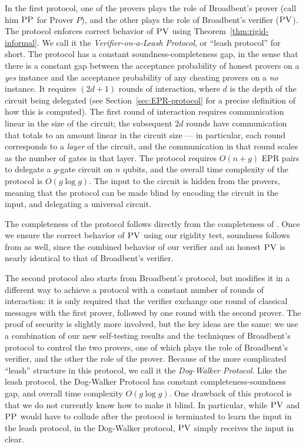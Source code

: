 \documentclass[11pt,letter]{article}
\theoremstyle{remark}
\theoremstyle{definition}
\newcommand{\pv}{\textsc{PV}}
\newcommand{\pp}{\textsc{PP}}
\begin{document}
In the first protocol, one of the provers plays the role of Broadbent's prover (call him $\pp$ for Prover $P$), and the other plays the role of Broadbent's verifier ($\pv$). The protocol enforces correct behavior of $\pv$ using Theorem~\ref{thm:rigid-informal}. We call it the \emph{Verifier-on-a-Leash Protocol}, or ``leash protocol'' for short. The protocol has a constant soundness-completeness gap, in the sense that there is a constant gap between the acceptance probability of honest provers on a \textit{yes} instance and the acceptance probability of any cheating provers on a \textit{no} instance. It requires $(2d+1)$ rounds of interaction, where $d$ is the depth of the circuit being delegated (see Section~\ref{sec:EPR-protocol} for a precise definition of how this is computed). The first round of interaction requires communication linear in the size of the circuit; the subsequent $2d$ rounds have communication that totals to an amount linear in the circuit size --- in particular, each round corresponds to a \emph{layer} of the circuit, and the communication in that round scales as the number of gates in that layer. The protocol requires $O(n+g)$ EPR pairs to delegate a $g$-gate circuit on $n$ qubits, and the overall time complexity of the protocol is $O(g\log g)$.
The input to the circuit is hidden from the provers, meaning that the protocol can be made blind by encoding the circuit in the input, and delegating a universal circuit. 

The completeness of the protocol follows directly from the completeness of \cite{broadbent15howtoverify}. Once we ensure the correct behavior of $\pv$ using our rigidity test, soundness follows from \cite{broadbent15howtoverify} as well, since the combined behavior of our verifier and an honest $\pv$ is nearly identical to that of Broadbent's verifier. 

The second protocol also starts from Broadbent's protocol, but modifies it in a different way to achieve a protocol with a constant number of rounds of interaction: it is only required that the verifier exchange one round of classical messages with the first prover, followed by one round with the second prover. The proof of security is slightly more involved, but the key ideas are  the same: we use a combination of our new self-testing results and the techniques of Broadbent's protocol to control the two provers, one of which plays the role of Broadbent's verifier, and the other the role of the prover. Because of the more complicated ``leash'' structure in this protocol, we call it the \emph{Dog-Walker Protocol}. 
 Like the leash protocol, the Dog-Walker Protocol has constant completeness-soundness gap, and overall time complexity $O(g\log g)$. One drawback of this protocol is that we do not currently know how to make it blind. In particular, while $\pv$ and $\pp$ would have to collude after the protocol is terminated to learn the input in the leash protocol, in the Dog-Walker protocol, $\pv$ simply receives the input in clear.
\end{document}
